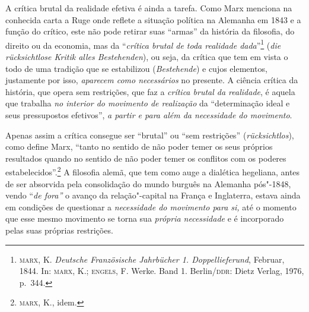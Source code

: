 A crítica brutal da realidade efetiva é ainda a tarefa. Como Marx
menciona na conhecida carta a Ruge onde reflete a situação política na
Alemanha em 1843 e a função do crítico, este não pode retirar suas
``armas'' da história da filosofia, do direito ou da economia, mas da %
``\emph{crítica brutal de toda realidade dada}''\footnote{\textsc{marx},
  K. \emph{Deutsche Französische Jahrbücher 1. Doppellieferund},
  Februar, 1844. In: \textsc{marx}, K.; \textsc{engels}, F. Werke. Band
  1. Berlin/\textsc{ddr}: Dietz Verlag, 1976, p.~344.} (\emph{die
rücksichtlose Kritik alles Bestehenden}), ou seja, da crítica que tem em
vista o todo de uma tradição que se estabilizou (\emph{Bestehende}) e
cujos elementos, justamente por isso, \emph{aparecem como necessários}
no presente. A ciência crítica da história, que opera sem restrições,
que faz a \emph{crítica brutal da realidade}, é aquela que trabalha
\emph{no interior do movimento de realização} da ``determinação ideal e
seus pressupostos efetivos'', \emph{a partir e para além da necessidade
do movimento}.

Apenas assim a crítica consegue ser ``brutal'' ou ``sem restrições''
(\emph{rücksichtlos}), como define Marx, ``tanto no sentido de não poder
temer os seus próprios resultados quando no sentido de não poder temer os
conflitos com os poderes estabelecidos''.\footnote{\textsc{marx}, K., idem.}
A filosofia alemã, que tem como auge a dialética hegeliana, antes de ser
absorvida pela consolidação do mundo burguês na Alemanha pós"-1848,
vendo ``\emph{de fora''} o avanço da relação"-capital na França e
Inglaterra, estava ainda em condições de questionar a \emph{necessidade
do movimento para si,} até o momento que esse mesmo movimento se torna
sua \emph{própria necessidade} e é incorporado pelas suas próprias
restrições.


